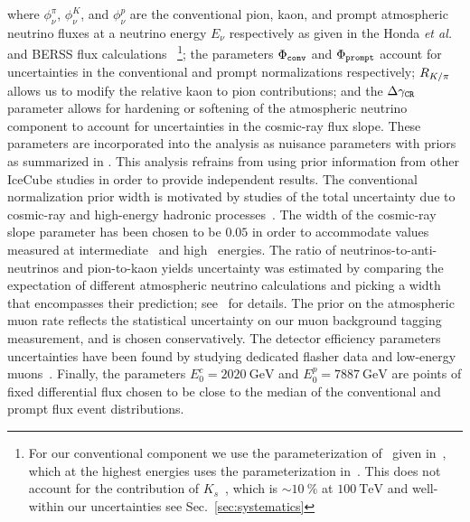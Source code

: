 where $\phi^\pi_\nu$, $\phi^K_\nu$, and $\phi^p_\nu$ are the conventional pion, kaon, and prompt atmospheric neutrino fluxes at a neutrino energy $E_\nu$ respectively as given in the Honda {\textit{et al.}} and BERSS flux calculations~\cite{Honda:2006qj,Bhattacharya:2015jpa}
\footnote{For our conventional component we use the parameterization of~\cite{Honda:2006qj} given in~\cite{Montaruli:2011as}, which at the highest energies uses the parameterization in~\cite{Gaisser:2002jj}.
	This does not account for the contribution of $K_s$~\cite{Gaisser:2014pda}, which is $\sim \SI{10}\percent$ at $\SI{100}\TeV$ and well-within our uncertainties see Sec.~\ref{sec:systematics}};
the parameters $\Phi_\texttt{conv}$ and $\Phi_\texttt{prompt}$ account for uncertainties in the conventional and prompt normalizations respectively; $R_{K/\pi}$ allows us to modify the relative kaon to pion contributions; and the $\Delta\gamma_\texttt{CR}$ parameter allows for hardening or softening of the atmospheric neutrino component to account for uncertainties in the cosmic-ray flux slope.
These parameters are incorporated into the analysis as nuisance parameters with priors as summarized in .
This analysis refrains from using prior information from other IceCube studies in order to provide independent results.
The conventional normalization prior width is motivated by studies of the total uncertainty due to cosmic-ray and high-energy hadronic processes~\cite{Fedynitch:2012fs}.
The width of the cosmic-ray slope parameter has been chosen to be $0.05$ in order to accommodate values measured at intermediate~\cite{Karelin:2011zz} and high~\cite{Bartoli:2015fhw,Yoon:2017qjx,Alfaro:2017cwx} energies.
The ratio of neutrinos-to-anti-neutrinos and pion-to-kaon yields uncertainty was estimated by comparing the expectation of different atmospheric neutrino calculations and picking a width that encompasses their prediction; see~\cite{CollinFluxes,Jones:2015bya} for details.
The prior on the atmospheric muon rate reflects the statistical uncertainty on our muon background tagging measurement, and is chosen conservatively.
The detector efficiency parameters uncertainties have been found by studying dedicated flasher data and low-energy muons~\cite{Aartsen:2016nxy}.
Finally, the parameters $E_0^c=\SI{2020}\GeV$ and $E_0^p=\SI{7887}\GeV$ are points of fixed differential flux chosen to be close to the median of the conventional and prompt flux event distributions.

